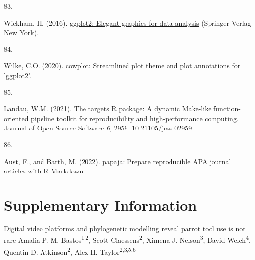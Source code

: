 \documentclass[
  man, donotrepeattitle,floatsintext]{apa6}
\newlength{\cslhangindent}
\newlength{\csllabelwidth}
\newlength{\cslentryspacingunit} %
\newenvironment{CSLReferences}[2] %
 {%
  \setlength{\parindent}{0pt}
  \ifodd #1
  \let\oldpar\par
  \def\par{\hangindent=\cslhangindent\oldpar}
  \fi
  \setlength{\parskip}{#2\cslentryspacingunit}
 }%
 {}
\newcommand{\CSLLeftMargin}[1]{\parbox[t]{\csllabelwidth}{#1}}
\newcommand{\CSLRightInline}[1]{\parbox[t]{\linewidth - \csllabelwidth}{#1}\break}
\begin{document}
\begin{CSLReferences}{0}{0}
\leavevmode{}%
\CSLLeftMargin{83. }%
\CSLRightInline{Wickham, H. (2016). \href{https://ggplot2.tidyverse.org}{{ggplot2}: Elegant graphics for data analysis} (Springer-Verlag New York).}

\leavevmode{}%
\CSLLeftMargin{84. }%
\CSLRightInline{Wilke, C.O. (2020). \href{https://CRAN.R-project.org/package=cowplot}{{cowplot}: Streamlined plot theme and plot annotations for 'ggplot2'}.}

\leavevmode{}%
\CSLLeftMargin{85. }%
\CSLRightInline{Landau, W.M. (2021). The targets {R} package: A dynamic {M}ake-like function-oriented pipeline toolkit for reproducibility and high-performance computing. Journal of Open Source Software \emph{6}, 2959. \href{https://doi.org/10.21105/joss.02959}{10.21105/joss.02959}.}

\leavevmode{}%
\CSLLeftMargin{86. }%
\CSLRightInline{Aust, F., and Barth, M. (2022). \href{https://github.com/crsh/papaja}{{papaja}: {Prepare} reproducible {APA} journal articles with {R Markdown}}.}

\end{CSLReferences}

\endgroup

\newpage
\vspace*{60mm}

\renewcommand{\figurename}{Figure}
\renewcommand{\tablename}{Table}
\renewcommand{\thefigure}{S\arabic{figure}} \setcounter{figure}{0}
\renewcommand{\thetable}{S\arabic{table}} \setcounter{table}{0}
\renewcommand{\theequation}{S\arabic{equation}} \setcounter{equation}{0}

\hypertarget{supplementary-information}{%
\section{\texorpdfstring{\textbf{Supplementary Information}}{Supplementary Information}}\label{supplementary-information}}

\setcounter{page}{1}
\centering

\noindent \hspace*{5mm} \small Digital video platforms and phylogenetic modelling reveal parrot tool use is not rare \newline
\hspace*{1cm} \small Amalia P. M. Bastos\textsuperscript{1,2}, Scott Claessens\textsuperscript{2}, Ximena J. Nelson\textsuperscript{3}, David Welch\textsuperscript{4}, \newline
\hspace*{25mm} Quentin D. Atkinson\textsuperscript{2}, Alex H. Taylor\textsuperscript{2,3,5,6} \newline
\end{document}
